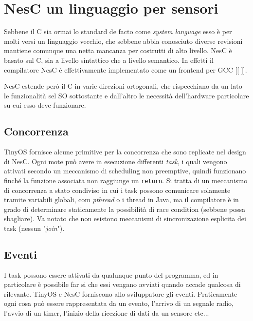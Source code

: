 \documentclass[pdftex,12pt,a4paper,italian,openany]{book}
\begin{document}
\section{NesC un linguaggio per sensori}

Sebbene il C sia ormai lo standard de facto come \emph{system language} esso è per molti versi 
un linguaggio vecchio, che sebbene abbia conosciuto diverse revisioni mantiene comunque una 
netta mancanza per costrutti di alto livello. 
NesC è basato sul C, sia a livello sintattico che a livello semantico. 
In effetti il compilatore NesC è effettivamente implementato come un frontend per GCC [[ ]].

NesC estende però il C in varie direzioni ortogonali, che rispecchiano da un lato le funzionalità
sel SO sottostante e dall'altro le necessità dell'hardware particolare su cui esso deve funzionare. 

\subsection{Concorrenza}
TinyOS fornisce alcune primitive per la concorrenza che sono replicate nel design di NesC.
Ogni mote può avere in esecuzione differenti \emph{task}, i quali vengono attivati secondo un 
meccanismo di scheduling non preemptive, quindi funzionano finché la funzione associata non 
raggiunge un \texttt{return}. Si tratta di un meccanismo di concorrenza a stato condiviso in cui 
i task possono comunicare solamente tramite variabili globali, com \emph{pthread} o i thread in 
Java, ma il compilatore è in grado di determinare staticamente la possibilità di race condition 
(sebbene possa sbagliare). Va notato che non esistono meccanismi di sincronizazione esplicita 
dei task (nessun "\emph{join}").

\subsection{Eventi}
I task possono essere attivati da qualunque punto del programma, ed in particolare è possibile 
far si che essi vengano avviati quando accade qualcosa di rilevante. 
TinyOS e NesC forniscono allo sviluppatore gli eventi. Praticamente ogni cosa può essere 
rappresentata da un evento, l'arrivo di un segnale radio, l'avvio di un timer, l'inizio della ricezione di dati da un sensore etc...
 
\end{document}
